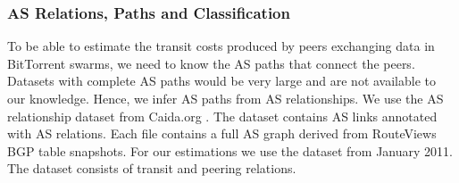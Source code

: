 
\subsubsection{AS Relations, Paths and Classification}

To be able to estimate the transit costs produced by peers exchanging data in BitTorrent swarms, we need to know the AS paths that connect the peers. Datasets with complete AS paths would be very large and are not available to our knowledge. Hence, we infer AS paths from AS relationships.
We use the AS relationship dataset from Caida.org \cite{caidaas}. The dataset contains AS links annotated with AS relations. Each file contains a full AS graph derived from RouteViews BGP table snapshots. For our estimations we use the dataset from January 2011. The dataset consists of transit and peering relations.


